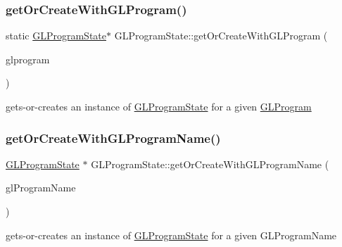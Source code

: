 \subsubsection{\texorpdfstring{get\+Or\+Create\+With\+G\+L\+Program()}{getOrCreateWithGLProgram()}\hspace{0.1cm}{\footnotesize\ttfamily [2/2]}}
{\footnotesize\ttfamily static \hyperlink{classGLProgramState}{G\+L\+Program\+State}$\ast$ G\+L\+Program\+State\+::get\+Or\+Create\+With\+G\+L\+Program (\begin{DoxyParamCaption}\item[{\hyperlink{classGLProgram}{G\+L\+Program} $\ast$}]{glprogram }\end{DoxyParamCaption})\hspace{0.3cm}{\ttfamily [static]}}

gets-\/or-\/creates an instance of \hyperlink{classGLProgramState}{G\+L\+Program\+State} for a given \hyperlink{classGLProgram}{G\+L\+Program} \mbox{\label{classGLProgramState_adac4b6fae04fff79a0ac28b1c5cac23e}} 
\subsubsection{\texorpdfstring{get\+Or\+Create\+With\+G\+L\+Program\+Name()}{getOrCreateWithGLProgramName()}\hspace{0.1cm}{\footnotesize\ttfamily [1/4]}}
{\footnotesize\ttfamily \hyperlink{classGLProgramState}{G\+L\+Program\+State} $\ast$ G\+L\+Program\+State\+::get\+Or\+Create\+With\+G\+L\+Program\+Name (\begin{DoxyParamCaption}\item[{const std\+::string \&}]{gl\+Program\+Name }\end{DoxyParamCaption})\hspace{0.3cm}{\ttfamily [static]}}

gets-\/or-\/creates an instance of \hyperlink{classGLProgramState}{G\+L\+Program\+State} for a given G\+L\+Program\+Name \mbox{\label{classGLProgramState_a4a5473acf86f5f85b1c8ca1afe114078}} 
